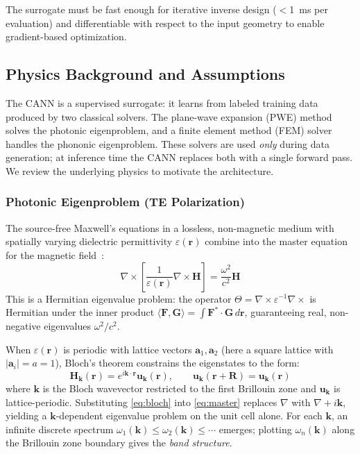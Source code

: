 \documentclass[11pt]{article}
\begin{document}
The surrogate must be fast enough for iterative inverse design ($<$1~ms per evaluation) and differentiable with respect to the input geometry to enable gradient-based optimization.

\subsection{Physics Background and Assumptions}
\label{sec:physics}

The CANN is a supervised surrogate: it learns from labeled training data produced by two classical solvers. The plane-wave expansion (PWE) method solves the photonic eigenproblem, and a finite element method (FEM) solver handles the phononic eigenproblem. These solvers are used \emph{only} during data generation; at inference time the CANN replaces both with a single forward pass. We review the underlying physics to motivate the architecture.

\subsubsection{Photonic Eigenproblem (TE Polarization)}

The source-free Maxwell's equations in a lossless, non-magnetic medium with spatially varying dielectric permittivity $\varepsilon(\mathbf{r})$ combine into the master equation for the magnetic field~\cite{joannopoulos2008}:
\begin{equation}
    \nabla \times \left[\frac{1}{\varepsilon(\mathbf{r})} \nabla \times \mathbf{H}\right] = \frac{\omega^2}{c^2} \mathbf{H}
    \label{eq:master}
\end{equation}
This is a Hermitian eigenvalue problem: the operator $\Theta = \nabla \times \varepsilon^{-1} \nabla \times$ is Hermitian under the inner product $\langle \mathbf{F}, \mathbf{G} \rangle = \int \mathbf{F}^* \cdot \mathbf{G}\, d\mathbf{r}$, guaranteeing real, non-negative eigenvalues $\omega^2/c^2$.

When $\varepsilon(\mathbf{r})$ is periodic with lattice vectors $\mathbf{a}_1, \mathbf{a}_2$ (here a square lattice with $|\mathbf{a}_i| = a = 1$), Bloch's theorem constrains the eigenstates to the form:
\begin{equation}
    \mathbf{H}_{\mathbf{k}}(\mathbf{r}) = e^{i\mathbf{k}\cdot\mathbf{r}} \mathbf{u}_{\mathbf{k}}(\mathbf{r}), \qquad \mathbf{u}_{\mathbf{k}}(\mathbf{r} + \mathbf{R}) = \mathbf{u}_{\mathbf{k}}(\mathbf{r})
    \label{eq:bloch}
\end{equation}
where $\mathbf{k}$ is the Bloch wavevector restricted to the first Brillouin zone and $\mathbf{u}_\mathbf{k}$ is lattice-periodic. Substituting \cref{eq:bloch} into \cref{eq:master} replaces $\nabla$ with $\nabla + i\mathbf{k}$, yielding a $\mathbf{k}$-dependent eigenvalue problem on the unit cell alone. For each $\mathbf{k}$, an infinite discrete spectrum $\omega_1(\mathbf{k}) \leq \omega_2(\mathbf{k}) \leq \cdots$ emerges; plotting $\omega_n(\mathbf{k})$ along the Brillouin zone boundary gives the \emph{band structure}.
\end{document}
